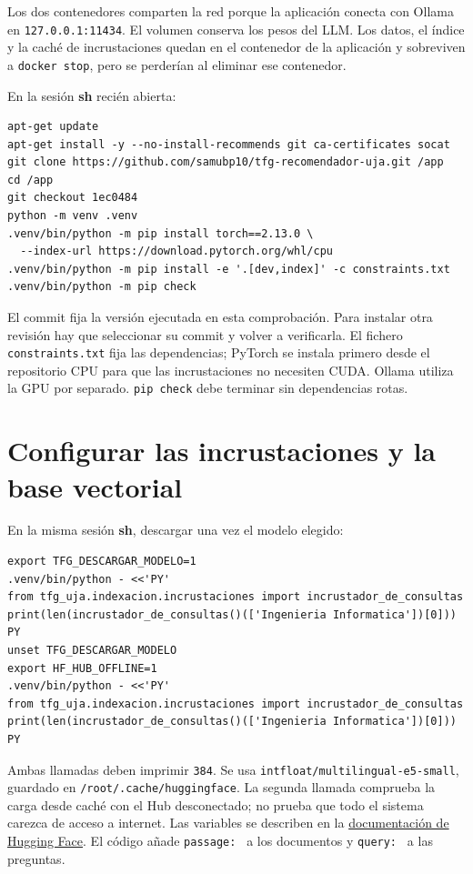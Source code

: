 Los dos contenedores comparten la red porque la aplicación conecta con Ollama
en \texttt{127.0.0.1:11434}. El volumen conserva los pesos del LLM. Los datos, el índice
y la caché de incrustaciones quedan en el contenedor de la aplicación y sobreviven
a \texttt{docker stop}, pero se perderían al eliminar ese contenedor.

En la sesión \textbf{sh} recién abierta:

\begingroup\footnotesize\begin{verbatim}
apt-get update
apt-get install -y --no-install-recommends git ca-certificates socat
git clone https://github.com/samubp10/tfg-recomendador-uja.git /app
cd /app
git checkout 1ec0484
python -m venv .venv
.venv/bin/python -m pip install torch==2.13.0 \
  --index-url https://download.pytorch.org/whl/cpu
.venv/bin/python -m pip install -e '.[dev,index]' -c constraints.txt
.venv/bin/python -m pip check
\end{verbatim}\endgroup

El commit fija la versión ejecutada en esta comprobación. Para instalar otra
revisión hay que seleccionar su commit y volver a verificarla. El fichero
\texttt{constraints.txt} fija las dependencias; PyTorch se instala primero desde el
repositorio CPU para que las incrustaciones no necesiten CUDA. Ollama utiliza
la GPU por separado. \texttt{pip check} debe terminar sin dependencias rotas.

\section{Configurar las incrustaciones y la base vectorial}

En la misma sesión \textbf{sh}, descargar una vez el modelo elegido:

\begingroup\footnotesize\begin{verbatim}
export TFG_DESCARGAR_MODELO=1
.venv/bin/python - <<'PY'
from tfg_uja.indexacion.incrustaciones import incrustador_de_consultas
print(len(incrustador_de_consultas()(['Ingenieria Informatica'])[0]))
PY
unset TFG_DESCARGAR_MODELO
export HF_HUB_OFFLINE=1
.venv/bin/python - <<'PY'
from tfg_uja.indexacion.incrustaciones import incrustador_de_consultas
print(len(incrustador_de_consultas()(['Ingenieria Informatica'])[0]))
PY
\end{verbatim}\endgroup

Ambas llamadas deben imprimir \texttt{384}. Se usa \texttt{intfloat/multilingual-e5-small},
guardado en \texttt{/root/.cache/huggingface}. La segunda llamada comprueba la carga
desde caché con el Hub desconectado; no prueba que todo el sistema carezca de
acceso a internet. Las variables se describen en la
\href{https://huggingface.co/docs/huggingface_hub/en/package_reference/environment_variables}{documentación de Hugging Face}.
El código añade \texttt{passage: } a los documentos y \texttt{query: } a las preguntas.

